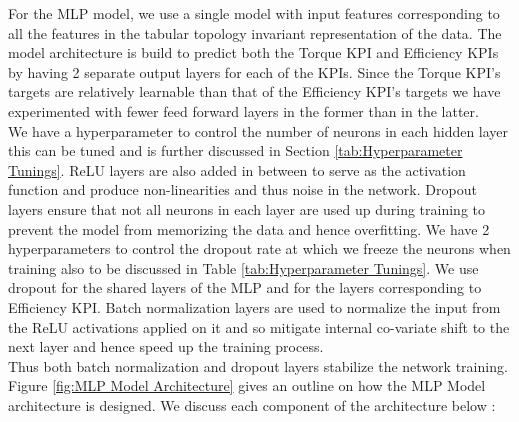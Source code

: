 \documentclass{report} %
\begin{document}
For the \ac{MLP} model, we use a single model with input features corresponding to all the features in the tabular topology invariant representation of the data.
The model architecture is build to predict both the Torque \ac{KPI} and Efficiency \ac{KPI}s by having 2 separate output layers for each of the \ac{KPI}s. 
Since the Torque \ac{KPI}'s targets are relatively learnable than that of the Efficiency \ac{KPI}'s targets we have experimented with fewer feed forward layers in the former than in the latter. \\
We have a hyperparameter to control the number of neurons in each hidden layer this can be tuned and is further discussed in Section \ref{tab:Hyperparameter Tunings}.
\ac{ReLU} layers are also added in between to serve as the activation function and produce non-linearities and thus noise in the network. 
Dropout layers ensure that not all neurons in each layer are used up during training to prevent the model from memorizing the data and hence overfitting.  
We have 2 hyperparameters to control the dropout rate at which we freeze the neurons when training also to be discussed in Table \ref{tab:Hyperparameter Tunings}.
We use dropout for the shared layers of the \ac{MLP} and for the layers corresponding to Efficiency \ac{KPI}.
Batch normalization layers are used to normalize the input from the \ac{ReLU} activations applied on it and so mitigate internal co-variate shift to the next layer and hence speed up the training process.\\
Thus both batch normalization and dropout layers stabilize the network training.
Figure \ref{fig:MLP Model Architecture} gives an outline on how the \ac{MLP} Model architecture is designed. 
We discuss each component of the architecture below :
\end{document}
